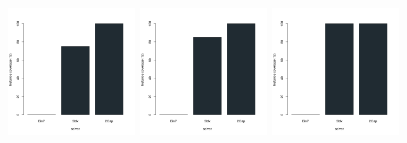 \begin{figure}[H]
\centering
\includegraphics[width=0.3\textwidth]{img/solver_instance_coverage_b=2_l_900s.png}
\includegraphics[width=0.3\textwidth]{img/solver_instance_coverage_b=2_l_1800s.png}
\includegraphics[width=0.3\textwidth]{img/solver_instance_coverage_b=2_l_2700s.png}
\caption*{\textsc{Zeitlimit} $15min$ $\quad\quad\quad$ \textsc{Zeitlimit} $30min$ $\quad\quad\quad$ \textsc{Zeitlimit} $45min$}
\begin{subfigure}[b]{0.3\textwidth}
\centering
{}
\end{subfigure}

\end{figure}
